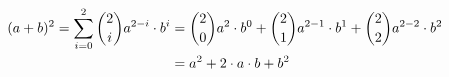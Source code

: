 \documentclass[12pt,a4paper]{book}\thispagestyle{empty}
\begin{document}
\begin{align}
(a+b)^2 = \sum_{i=0}^2 {2 \choose i} a^{2-i} \cdot b^i &= \binom{2}{0} a^2 \cdot b^0 + \binom{2}{1} a^{2-1} \cdot b^1 + \binom{2}{2} a^{2-2} \cdot b^2 \\
&= a^2 + 2 \cdot a \cdot b + b^2 \notag 
\end{align}
\end{document}
